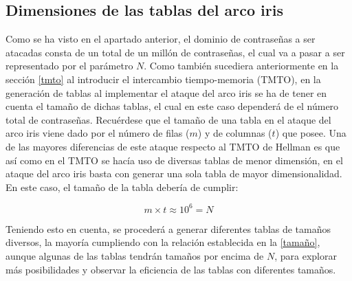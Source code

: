 \documentclass[12pt,spanish,listoffigures,listoftables,listofalgorithms]{tfgetsinf}
\begin{document}
\subsection{Dimensiones de las tablas del arco iris}

Como se ha visto en el apartado anterior, el dominio de contraseñas a ser atacadas consta de un total de un millón de contraseñas, el cual va a pasar a ser representado por el parámetro $N$. Como también sucediera anteriormente en la sección \ref{tmto} al introducir el intercambio tiempo-memoria (TMTO), en la generación de tablas al implementar el ataque del arco iris se ha de tener en cuenta el tamaño de dichas tablas, el cual en este caso dependerá de el número total de contraseñas. Recuérdese que el tamaño de una tabla en el ataque del arco iris viene dado por el número de filas ($m$) y de columnas ($t$) que posee. Una de las mayores diferencias de este ataque respecto al TMTO de Hellman es que así como en el TMTO se hacía uso de diversas tablas de menor dimensión, en el ataque del arco iris basta con generar una sola tabla de mayor dimensionalidad. En este caso, el tamaño de la tabla debería de cumplir:

\begin{center}
    \begin{equation}
        \tag{Fórmula 1}
        m \times t \approx 10^6 = N
        \label{tamaño}
    \end{equation}
\end{center}

Teniendo esto en cuenta, se procederá a generar diferentes tablas de tamaños diversos, la mayoría cumpliendo con la relación establecida en la \ref{tamaño}, aunque algunas de las tablas tendrán tamaños por encima de $N$, para explorar más posibilidades y observar la eficiencia de las tablas con diferentes tamaños.


    

    
\end{document}
